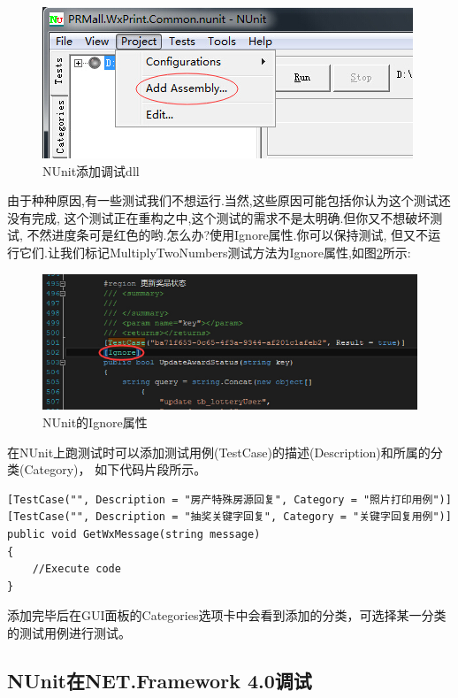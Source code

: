 \documentclass{book}
\begin{document}
\begin{figure}[htbp]
	\centering
	\includegraphics[scale=0.8]{NUnitAddAssembly.jpg}
	\caption{NUnit添加调试dll}
	\label{NUnitAddAssembly}
\end{figure}

由于种种原因,有一些测试我们不想运行.当然,这些原因可能包括你认为这个测试还没有完成,
这个测试正在重构之中,这个测试的需求不是太明确.但你又不想破坏测试,
不然进度条可是红色的哟.怎么办?使用Ignore属性.你可以保持测试,
但又不运行它们.让我们标记MultiplyTwoNumbers测试方法为Ignore属性,如图\ref{fig:UNitIgnoreAttribute}所示: 

\begin{figure}[htbp]
	\centering
	\includegraphics[scale=0.9]{UNitIgnoreAttribute.jpg}
	\caption{NUnit的Ignore属性}
	\label{fig:UNitIgnoreAttribute}
\end{figure}

在NUnit上跑测试时可以添加测试用例(TestCase)的描述(Description)和所属的分类(Category)，
如下代码片段所示。

\begin{lstlisting}[language={[Sharp]C}]
[TestCase("", Description = "房产特殊房源回复", Category = "照片打印用例")]
[TestCase("", Description = "抽奖关键字回复", Category = "关键字回复用例")]
public void GetWxMessage(string message)
{
	//Execute code
}
\end{lstlisting}

添加完毕后在GUI面板的Categories选项卡中会看到添加的分类，可选择某一分类的测试用例进行测试。

\subsection{NUnit在NET.Framework 4.0调试}
\end{document}
